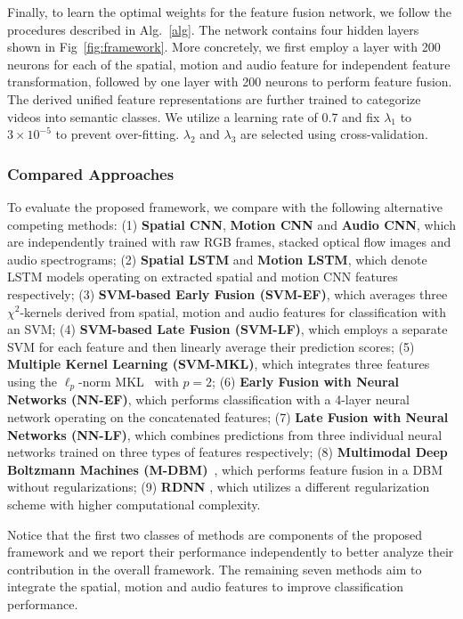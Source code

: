 \documentclass[journal]{IEEEtran}
\begin{document}
Finally, to learn the optimal weights for the feature fusion network, we follow the procedures described in Alg.~\ref{alg}. The network contains four hidden layers shown in Fig~\ref{fig:framework}. More concretely, we first employ a layer with 200 neurons for each of the spatial, motion and audio feature for independent feature transformation, followed by one layer with 200 neurons to perform feature fusion. The  derived unified feature representations are further trained to categorize videos into semantic classes. We utilize a learning rate of 0.7 and fix $\lambda_{1}$ to $3 \times 10^{-5} $ to prevent over-fitting. $\lambda_{2}$ and $\lambda_{3}$ are selected using cross-validation.

\subsubsection{Compared Approaches}

To evaluate the proposed framework, we compare with the following alternative competing methods: (1) \textbf{Spatial CNN}, \textbf{Motion CNN} and \textbf{Audio CNN}, which are independently trained with raw RGB frames, stacked optical flow images and audio spectrograms; (2) \textbf{Spatial LSTM} and \textbf{Motion LSTM}, which denote LSTM models operating on extracted spatial and motion CNN features respectively; (3) \textbf{SVM-based Early Fusion (SVM-EF)}, which averages three $\chi^2$-kernels derived from spatial, motion and audio features for classification with an SVM; (4) \textbf{SVM-based Late Fusion (SVM-LF)}, which employs a separate SVM for each feature and then linearly average their prediction scores; (5) \textbf{Multiple Kernel Learning (SVM-MKL)}, which integrates three features using the $\ell_p$-norm MKL~\cite{kloft2011lp} with $p=2$; 
(6) \textbf{Early Fusion with Neural Networks (NN-EF)}, which performs classification with a 4-layer neural network operating on the concatenated features; (7) \textbf{Late Fusion with Neural Networks (NN-LF)}, which combines predictions from three individual neural networks trained on three types of features respectively; (8) \textbf{Multimodal Deep Boltzmann Machines (M-DBM)}~\cite{ngiam2011multimodal,srivastava2012multimodal}, which performs feature fusion in a DBM without regularizations; (9) \textbf{RDNN} \cite{mm14:videoclassification}, which utilizes a different regularization scheme with higher computational complexity.

Notice that the first two classes of methods are components of the proposed framework and we report their performance independently to better analyze their contribution in the overall framework. The remaining seven methods aim to integrate the spatial, motion and audio features to improve classification performance.
\end{document}
